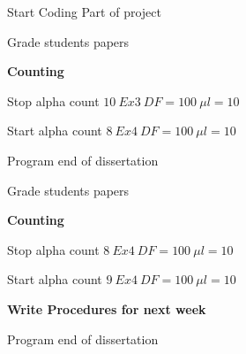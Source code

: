 \documentclass[idxtotoc,hyperref,openany,oneside]{labbook} %
\begin{document}

\begin{todolist}
\item{Start Coding Part of project}
\end{todolist}

\begin{todolist}
\item{Grade students papers}
\end{todolist}


\textbf{Counting}
\begin{todolist}
\item{Stop alpha count $\boxed{10\ Ex3\ DF=100\ \mu l=10}$}
\item{Start alpha count $\boxed{8\ Ex4\ DF=100\ \mu l=10}$}
\end{todolist}





\begin{todolist}
\item{Program end of dissertation}
\end{todolist}

\begin{todolist}
\item{Grade students papers}
\end{todolist}


\textbf{Counting}
\begin{todolist}
\item{Stop alpha count $\boxed{8\ Ex4\ DF=100\ \mu l=10}$}
\item{Start alpha count $\boxed{9\ Ex4\ DF=100\ \mu l=10}$}
\end{todolist}




\textbf{Write Procedures for next week}

\begin{todolist}
\item{Program end of dissertation}
\end{todolist}
\end{document}
